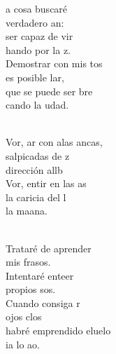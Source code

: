\documentclass[12pt]{article}
\begin{document}
\begin{multicols*}{2}
\begin{cancion}%
	a cosa buscaré\\
	 verdadero an: \\
	ser capaz de vir\\
	hando por la z.\\
	Demostrar con mis tos\\
	 es posible lar,\\
	que se puede ser bre\\
	cando la udad. \\\jump\\
	\begin{chorus}%
	Vor, ar con alas ancas,\\
	salpicadas de z\\
	dirección allb\\
	Vor, entir en las as\\
	la caricia del l\\
	la maana.\\
	\end{chorus}%
	\jump\\
Trataré de aprender\\
	mis frasos.\\
	Intentaré enteer\\
	 propios sos.\\
	Cuando consiga r\\
	 ojos clos\\
	habré emprendido eluelo\\
	ia lo ao.  \\
\end{cancion}%


\end{multicols*}
\end{document}
